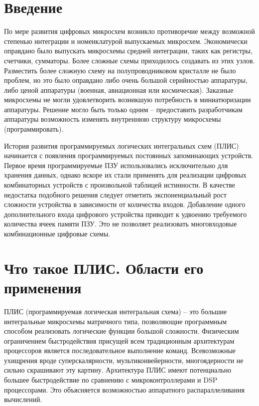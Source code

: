 \section*{Введение}

По мере развития цифровых микросхем возникло противоречие между возможной
степенью интеграции и номенклатурой выпускаемых микросхем. Экономически
оправдано было выпускать микросхемы средней интеграции, таких как регистры,
счетчики, сумматоры. Более сложные схемы приходилось создавать из этих узлов.
Разместить более сложную схему на полупроводниковом кристалле не было проблем,
но это было оправдано либо очень большой серийностью аппаратуры, либо ценой
аппаратуры (военная, авиационная или космическая). Заказные микросхемы не могли
удовлетворить возникшую потребность в миниатюризации аппаратуры. Решение могло
быть только одним -- предоставить разработчикам аппаратуры возможность изменять
внутреннюю структуру микросхемы (программировать).

История развития программируемых логических интегральных схем (ПЛИС) начинается
с появления программируемых постоянных запоминающих устройств. Первое время
программируемые ПЗУ использовались исключительно для хранения данных, однако
вскоре их стали применять для реализации цифровых комбинаторных устройств с
произвольной таблицей истинности. В качестве недостатка подобного решения
следует отметить экспоненциальный рост сложности устройства в зависимости от
количества входов. Добавление одного дополнительного входа цифрового устройства
приводит к удвоению требуемого количества ячеек памяти ПЗУ. Это не позволяет
реализовать многовходовые комбинационные цифровые схемы. 

\vspace*{2em} %

\section{Что такое ПЛИС. Области его применения}

ПЛИС (программируемая логическая интегральная схема) -- это большие
интегральные микросхемы матричного типа, позволяющие программным способом
реализовать логические функции большой сложности. Физическим ограничением
быстродействия присущей всем традиционным архитектурам процессоров является
последовательное выполнение команд. Всевозможные ухищрения вроде
суперскалярности, мультиконвейерности, многоядерности не сильно скрашивают эту
картину. Архитектура ПЛИС имеют потенциально большее быстродействие по
сравнению с микроконтроллерами и DSP процессорами. Это объясняется возможностью
аппаратного распараллеливания вычислений.


